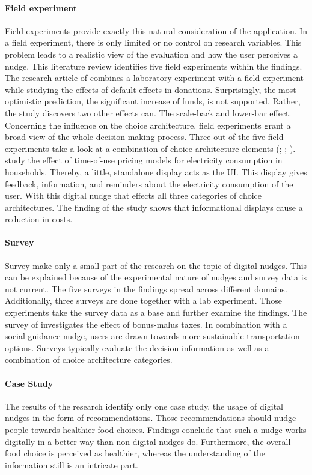 \paragraph{Field experiment}
Field experiments provide exactly this natural consideration of the application. In a field experiment, there is only limited or no control on research variables. This problem leads to a realistic view of the evaluation and how the user perceives a nudge. This literature review identifies five field experiments within the findings. The research article of \cite{goswami_when_2016} combines a laboratory experiment with a field experiment while studying the effects of default effects in donations. Surprisingly, the most optimistic prediction, the significant increase of funds, is not supported. Rather, the study discovers two other effects can. The scale-back and lower-bar effect. 
Concerning the influence on the choice architecture, field experiments grant a broad view of the whole decision-making process. Three out of the five field experiments take a look at a combination of choice architecture elements (\cite{miller_effects_2016}; \cite{cosmo_nudging_2017}; \cite{mazar_if_2018}). \cite{cosmo_nudging_2017} study the effect of time-of-use pricing models for electricity consumption in households. Thereby, a little, standalone display acts as the UI. This display gives feedback, information, and reminders about the electricity consumption of the user. With this digital nudge that effects all three categories of choice architectures. The finding of the study shows that informational displays cause a reduction in costs.

\paragraph{Survey}
Survey make only a small part of the research on the topic of digital nudges. This can be explained because of the experimental nature of nudges and survey data is not current. The five surveys in the findings spread across different domains. Additionally, three surveys are done together with a lab experiment. Those experiments take the survey data as a base and further examine the findings. The survey of \cite{hilton_tax_2014} investigates the effect of bonus-malus taxes. In combination with a social guidance nudge, users are drawn towards more sustainable transportation options. Surveys typically evaluate the decision information as well as a combination of choice architecture categories.

\paragraph{Case Study}
 The results of the research identify only one case study. \cite{guthrie_nudging_2015} the usage of digital nudges in the form of recommendations. Those recommendations should nudge people towards healthier food choices. Findings conclude that such a nudge works digitally in a better way than non-digital nudges do. Furthermore, the overall food choice is perceived as healthier, whereas the understanding of the information still is an intricate part.


